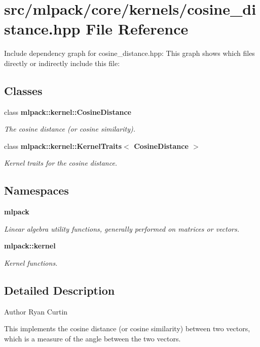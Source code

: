 \section{src/mlpack/core/kernels/cosine\-\_\-distance.hpp File Reference}
\label{cosine__distance_8hpp}
Include dependency graph for cosine\-\_\-distance.\-hpp\-:
This graph shows which files directly or indirectly include this file\-:
\subsection*{Classes}
\begin{DoxyCompactItemize}
\item 
class {\bf mlpack\-::kernel\-::\-Cosine\-Distance}
\begin{DoxyCompactList}\small\item\em The cosine distance (or cosine similarity). \end{DoxyCompactList}\item 
class {\bf mlpack\-::kernel\-::\-Kernel\-Traits$<$ Cosine\-Distance $>$}
\begin{DoxyCompactList}\small\item\em Kernel traits for the cosine distance. \end{DoxyCompactList}\end{DoxyCompactItemize}
\subsection*{Namespaces}
\begin{DoxyCompactItemize}
\item 
{\bf mlpack}
\begin{DoxyCompactList}\small\item\em Linear algebra utility functions, generally performed on matrices or vectors. \end{DoxyCompactList}\item 
{\bf mlpack\-::kernel}
\begin{DoxyCompactList}\small\item\em Kernel functions. \end{DoxyCompactList}\end{DoxyCompactItemize}


\subsection{Detailed Description}
\begin{DoxyAuthor}{Author}
Ryan Curtin
\end{DoxyAuthor}
This implements the cosine distance (or cosine similarity) between two vectors, which is a measure of the angle between the two vectors.


